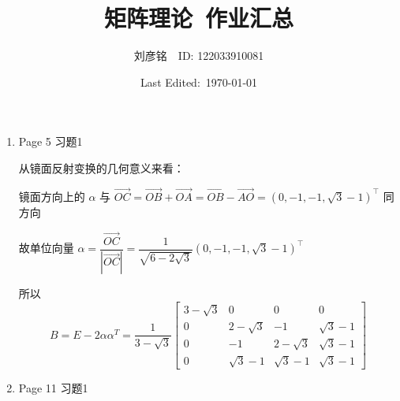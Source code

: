 \documentclass{article}
\title{矩阵理论\ 作业汇总}
\author{刘彦铭\ \ ID: 122033910081}
\date{Last Edited:\ \today}
\begin{document}
\maketitle

\begin{spacing}{1.5}

\begin{enumerate}
    \item Page 5 习题1
    
    从镜面反射变换的几何意义来看：
        \begin{figure}[htb]
            \centering 
        \end{figure}
    
    镜面方向上的 $\alpha$ 与 $\overrightarrow{OC} = \overrightarrow{OB} + \overrightarrow{OA} = \overrightarrow{OB} - \overrightarrow{AO} = (0, -1, -1, \sqrt3-1)^\top$ 同方向
    
    故单位向量 $\alpha=\dfrac{\overrightarrow{OC}}{|\overrightarrow{OC}|}=\dfrac{1}{\sqrt{6-2\sqrt3}}(0, -1, -1, \sqrt3 - 1)^\top$

    所以 
    $$B=E-2\alpha\alpha^T=\dfrac{1}{3 - \sqrt 3}\left[\begin{array}{cccc}
        3 - \sqrt 3 & 0 & 0 & 0 \\
        0 & 2 - \sqrt 3 & -1 & \sqrt 3 - 1 \\
        0 & -1 & 2 -\sqrt 3 & \sqrt 3 - 1 \\
        0 & \sqrt 3 - 1 & \sqrt 3 - 1 & \sqrt 3 - 1    
    \end{array}\right]$$

    \item Page 11 习题1 
    

\end{enumerate}
\end{spacing}
\end{document}
